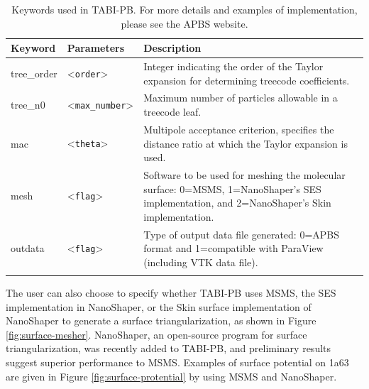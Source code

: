 \documentclass[11pt,titlepage]{article}
\begin{document}
\begin{table}[!htbp]
	\begin{minipage}{0.99\textwidth}
		\centering
		\caption{\small Keywords used in TABI-PB. For more details and examples of implementation, please see the APBS website. }
		\vspace{1mm}
		
		\newcommand{\param}[1]{\textless\texttt{#1}\textgreater}
		\newcommand\T{\rule{0pt}{0.8ex}}       %
		
		\setlength{\colthree}{8.3cm}
		\setlength{\coltwo}{2.8cm}
		{\small
			\begin{tabular}{ l  l l  }				
				{Keyword} & {Parameters} & {Description} \\ \hline
				\T tree\_order & \param{order} & \parbox[t]{\colthree}{Integer indicating the order of the Taylor expansion for determining treecode coefficients.} \\
				\T tree\_n0 & \param{max\_number} & \parbox[t]{\colthree}{Maximum number of particles allowable in a treecode leaf.}\\ 
				\T mac & \param{theta} & \parbox[t]{\colthree}{Multipole acceptance criterion, specifies the distance ratio at which the Taylor expansion is used.}\\ 
				\hline 
				\T mesh & \param{flag} & \parbox[t]{\colthree}{Software to be used for meshing the molecular surface: 0=MSMS, 1=NanoShaper's SES implementation, and 2=NanoShaper's Skin implementation.}  \\
				\hline
				\T outdata & \param{flag} & \parbox[t]{\colthree}{Type of output data file generated: 0=APBS format and 1=compatible with ParaView (including VTK data file).}  \\
				\label{tab:TABIPB-keywords}
			\end{tabular}
		} %
	\end{minipage}
\end{table}
%
The user can also choose to specify whether TABI-PB uses MSMS, the SES implementation in NanoShaper, or the Skin surface implementation of NanoShaper to generate a surface triangularization, as shown in Figure \ref{fig:surface-mesher}. NanoShaper, an open-source program for surface triangularization, was recently added to TABI-PB, and preliminary results suggest superior performance to MSMS. Examples of surface potential on 1a63 are given in Figure \ref{fig:surface-protential} by using MSMS and NanoShaper.
\end{document}
